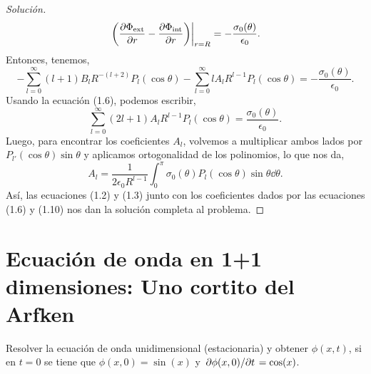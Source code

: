 \documentclass[11pt]{article}
\theoremstyle{definition}
\numberwithin{equation}{section}
\begin{document}
\begin{proof}[Solución]
  \begin{equation}
    \eval{\pqty{\pdv{\Phi_{\text{ext}}}{r} - \pdv{\Phi_{\text{int}}}{r}}}_{r=R} = -\frac{\sigma_0(\theta)}{\epsilon_0}.
  \end{equation}
  Entonces, tenemos,
  \begin{equation}
    -\sum_{l=0}^{\infty}(l+1)B_l R^{-(l+2)} P_l(\cos\theta) - \sum_{l=0}^{\infty}l A_l R^{l-1} P_l(\cos\theta) = -\frac{\sigma_0(\theta)}{\epsilon_0}.
  \end{equation}
  Usando la ecuación (1.6), podemos escribir,
  \begin{equation}
    \sum_{l=0}^{\infty}(2l+1)A_l R^{l-1} P_l(\cos\theta) = \frac{\sigma_0(\theta)}{\epsilon_0}.
  \end{equation}
  Luego, para encontrar los coeficientes $A_l$, volvemos a multiplicar ambos lados por $P_{l'}(\cos\theta)\sin\theta$ y aplicamos ortogonalidad de los polinomios, lo que nos da,
  \begin{equation}
    \boxed{A_l = \frac{1}{2\epsilon_0 R^{l-1}}\int_0^{\pi}\sigma_0(\theta)P_l(\cos\theta)\sin\theta \dd{\theta}}.
  \end{equation}
  Así, las ecuaciones (1.2) y (1.3) junto con los coeficientes dados por las ecuaciones (1.6) y (1.10) nos dan la solución completa al problema.
\end{proof}

\section{Ecuación de onda en 1+1 dimensiones: Uno cortito del Arfken}

\begin{Exercise*}[title={Ejercicio 9.6.1}, name={}, origin={Arfken, Weber, Harris, Mathematical Methods for Physicists}]

  Resolver la ecuación de onda unidimensional (estacionaria) y obtener $\phi(x,t)$, si en $t=0$ se tiene que $\phi(x,0) = \sin(x)$ y $\pdv*{\phi(x,0)}{t}= \cos(x)$.

\end{Exercise*}
\end{document}
